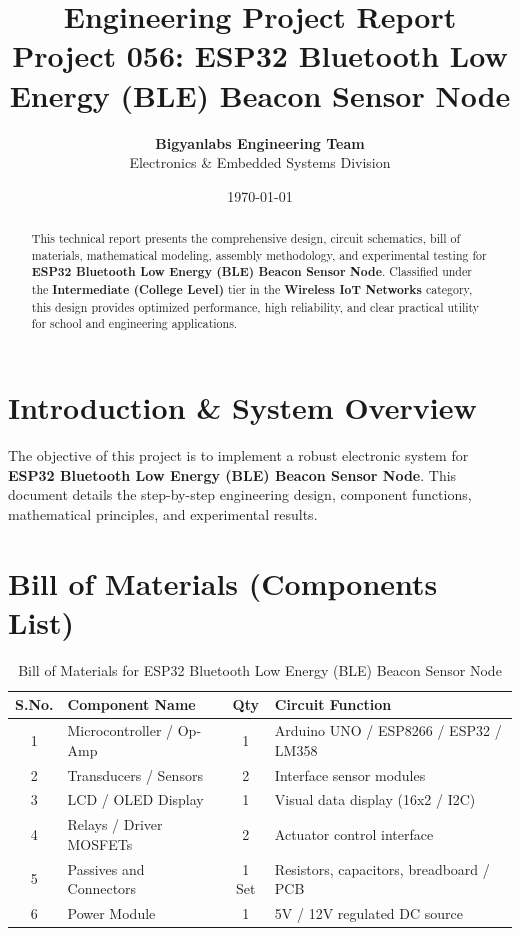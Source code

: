 \documentclass[11pt,a4paper]{article}
\title{\textbf{\Huge Engineering Project Report}\\[0.5em] \Large Project 056: ESP32 Bluetooth Low Energy (BLE) Beacon Sensor Node}
\author{\textbf{Bigyanlabs Engineering Team}\\ Electronics \& Embedded Systems Division}
\date{\today}
\begin{document}
\maketitle
\thispagestyle{empty}

\begin{abstract}
This technical report presents the comprehensive design, circuit schematics, bill of materials, mathematical modeling, assembly methodology, and experimental testing for \textbf{ESP32 Bluetooth Low Energy (BLE) Beacon Sensor Node}. Classified under the \textbf{Intermediate (College Level)} tier in the \textbf{Wireless IoT Networks} category, this design provides optimized performance, high reliability, and clear practical utility for school and engineering applications.
\end{abstract}

\newpage
\tableofcontents
\newpage

\section{Introduction \& System Overview}
The objective of this project is to implement a robust electronic system for \textbf{ESP32 Bluetooth Low Energy (BLE) Beacon Sensor Node}. This document details the step-by-step engineering design, component functions, mathematical principles, and experimental results.

\section{Bill of Materials (Components List)}
\begin{table}[h!]
\centering
\caption{Bill of Materials for ESP32 Bluetooth Low Energy (BLE) Beacon Sensor Node}
\vspace{0.5em}
\begin{tabular}{clcp{7cm}}
\toprule
\textbf{S.No.} & \textbf{Component Name} & \textbf{Qty} & \textbf{Circuit Function} \\
\midrule
1 & Microcontroller / Op-Amp & 1 & Arduino UNO / ESP8266 / ESP32 / LM358 \\
2 & Transducers / Sensors & 2 & Interface sensor modules \\
3 & LCD / OLED Display & 1 & Visual data display (16x2 / I2C) \\
4 & Relays / Driver MOSFETs & 2 & Actuator control interface \\
5 & Passives and Connectors & 1 Set & Resistors, capacitors, breadboard / PCB \\
6 & Power Module & 1 & 5V / 12V regulated DC source \\
\bottomrule
\end{tabular}
\end{table}
\end{document}
